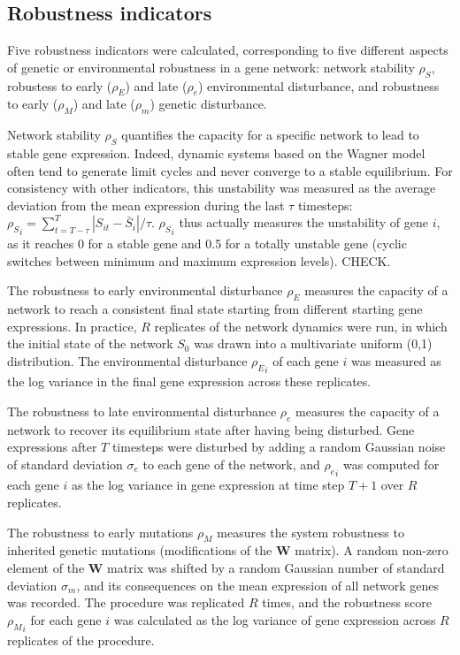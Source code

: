 \documentclass{article}
\newcommand{\stability}{{\rho_S}}
\newcommand{\earlyenv}{{\rho_E}}
\newcommand{\lateenv}{{\rho_e}}
\newcommand{\earlymut}{{\rho_M}}
\newcommand{\latemut}{{\rho_m}}
\begin{document}
\subsection{Robustness indicators}

Five robustness indicators were calculated, corresponding to five different aspects of genetic or environmental robustness in a gene network: network stability $\stability$, robustess to early ($\earlyenv$) and late ($\lateenv$) environmental disturbance, and robustness to early ($\earlymut$) and late ($\latemut$) genetic disturbance. 

Network stability $\stability$ quantifies the capacity for a specific network to lead to stable gene expression. Indeed, dynamic systems based on the Wagner model often tend to generate limit cycles and never converge to a stable equilibrium. For consistency with other indicators, this unstability was measured as the average deviation from the mean expression during the last $\tau$ timesteps: $\stability_i = \sum_{t=T-\tau}^T |S_{it}-\bar S_i| / \tau$. $\stability_i$ thus actually measures the unstability of gene $i$, as it reaches 0 for a stable gene and 0.5 for a totally unstable gene (cyclic switches between minimum and maximum expression levels). CHECK.

The robustness to early environmental disturbance $\earlyenv$ measures the capacity of a network to reach a consistent final state starting from different starting gene expressions. In practice, $R$ replicates of the network dynamics were run, in which the initial state of the network $S_0$ was drawn into a multivariate uniform (0,1) distribution. The environmental disturbance $\earlyenv_i$ of each gene $i$ was measured as the log variance in the final gene expression across these replicates. 

The robustness to late environmental disturbance $\lateenv$ measures the capacity of a network to recover its equilibrium state after having being disturbed. Gene expressions after $T$ timesteps were disturbed by adding a random Gaussian noise of standard deviation $\sigma_e$ to each gene of the network, and $\lateenv_i$ was computed for each gene $i$ as the log variance in gene expression at time step $T+1$ over $R$ replicates. 

The robustness to early mutations $\earlymut$ measures the system robustness to inherited genetic mutations (modifications of the $\bm W$ matrix). A random non-zero element of the $\bm W$ matrix was shifted by a random Gaussian number of standard deviation $\sigma_m$, and its consequences on the mean expression of all network genes was recorded. The procedure was replicated $R$ times, and the robustness score $\earlymut_i$ for each gene $i$ was calculated as the log variance of gene expression across $R$ replicates of the procedure. 
\end{document}
